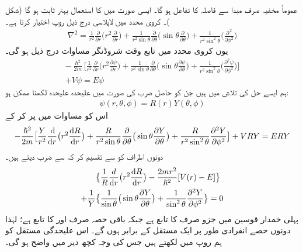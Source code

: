   عموماً مخفیہ صرف مبدا سے فاصلہ کا تفاعل ہو گا۔ ایسی صورت میں      کا استعمال بہتر ثابت ہو گا (شکل )۔  
کروی محدد میں لاپلاسی درج ذیل روپ اختیار کرتا ہے۔
\begin{align}
\nabla^{2}=\frac{1}{r^{2}}\frac{\partial}{\partial{r}}\big (r^{2}\frac{\partial}{\partial{r}}\big )+\frac{1}{r^{2}\sin{\theta}}\frac{\partial}{\partial{\theta}}\big(\sin{\theta}\frac{\partial}{\partial{\theta}}\big )+\frac{1}{r^{2}\sin^{2}{\theta}}\big(\frac{\partial^{\,2}}{\partial{\phi^{2}}}\big ) 
\end{align}
یوں کروی محدد میں تابع وقت شروڈنگر مساوات درج ذیل ہو گی۔ 
\begin{multline}\label{مساوات_ابعادی_لاپلاسی_ب}
-\frac{\hslash^{2}}{2m}\big [\frac{1}{r^{2}}\frac{\partial}{\partial{r}}\big (r^{2}\frac{\partial\psi}{\partial{r}}\big )+\frac{1}{r^{2}\sin{\theta}}\frac{\partial}{\partial{\theta}}\big(\sin{\theta}\frac{\partial\psi}{\partial{\theta}}\big )+\frac{1}{r^{2}\sin^{2}{\theta}}\big(\frac{\partial^{2}\psi}{\partial{\phi^{2}}}\big )\big ]\\
+V\psi=E\psi 
\end{multline}
ہم ایسے حل کی تلاش میں ہیں جن کو حاصل ضرب کی صورت میں علیحدہ علیحدہ لکھنا ممکن ہو:
\begin{align}
\psi(r,\theta,\phi)=R(r)Y(\theta,\phi) 
\end{align}
اس کو مساوات  میں پر کر کے
\begin{multline*}
-\frac{\hslash^{2}}{2m}\big [\frac{Y}{r^{2}}\frac{\dif}{\dif{r}}\big (r^{2}\frac{\dif{R}}{\dif{r}}\big )+\frac{R}{r^{2}\sin{\theta}}\frac{\partial}{\partial{\theta}}\big(\sin{\theta}\frac{\partial{Y}}{\partial{\theta}}\big )+\frac{R}{r^{2}\sin^{2}{\theta}}\frac{\partial^{2}{Y}}{\partial{\phi^{2}}}\big ]+VRY=ERY 
\end{multline*}
دونوں اطراف کو  سے تقسیم کر کہ  سے ضرب دیتے ہیں۔
\begin{align*}
&\big\{\frac{1}{R}\frac{d}{\dif{r}}\big(r^{2}\frac{\dif{R}}{\dif{r}}\big)-\frac{2mr^{2}}{\hslash^{2}}[V(r)-E]\big\} \\
+\frac{1}{Y}&\big\{\frac{1}{\sin{\theta}}\big(\sin{\theta}\frac{\partial{Y}}{\partial{\theta}}\big)+\frac{1}{\sin^{2}{\theta}}\frac{\partial^{2}{Y}}{\partial{\phi^{2}}}\big\}=0 
\end{align*}
پہلی خمدار قوسین میں جزو صرف  کا تابع ہے جبکہ باقی حصہ صرف     اور      کا تابع ہے؛  لہٰذا دونوں حصے انفرادی طور پر ایک مستقل کے برابر ہوں گے۔ اس علیحدگی مستقل کو ہم   روپ میں لکھتے ہیں جس کی وجہ کچھ دیر میں واضح ہو گی۔

